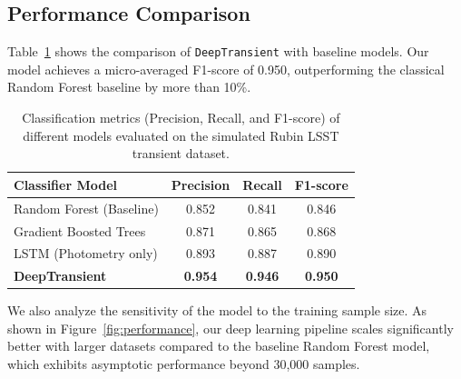 \documentclass[11pt]{article}
\begin{document}
\subsection{Performance Comparison}
Table~\ref{tab:metrics} shows the comparison of \texttt{DeepTransient} with baseline models. Our model achieves a micro-averaged F1-score of 0.950, outperforming the classical Random Forest baseline by more than 10\%.

\begin{table}[htbp]
\centering
\caption{Classification metrics (Precision, Recall, and F1-score) of different models evaluated on the simulated Rubin LSST transient dataset.}
\label{tab:metrics}
\vspace{0.3cm}
\begin{tabular}{lccc}
\toprule
\textbf{Classifier Model} & \textbf{Precision} & \textbf{Recall} & \textbf{F1-score} \\
\midrule
Random Forest (Baseline) & 0.852 & 0.841 & 0.846 \\
Gradient Boosted Trees   & 0.871 & 0.865 & 0.868 \\
LSTM (Photometry only)   & 0.893 & 0.887 & 0.890 \\
\textbf{DeepTransient}    & \textbf{0.954} & \textbf{0.946} & \textbf{0.950} \\
\bottomrule
\end{tabular}
\end{table}

We also analyze the sensitivity of the model to the training sample size. As shown in Figure~\ref{fig:performance}, our deep learning pipeline scales significantly better with larger datasets compared to the baseline Random Forest model, which exhibits asymptotic performance beyond 30,000 samples.
\end{document}
